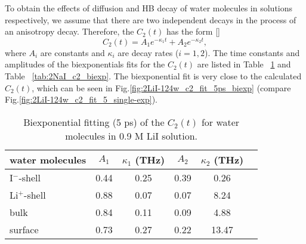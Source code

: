 To obtain the effects of diffusion and HB decay of water molecules
in solutions respectively, we assume that there are two independent 
decays in the process of an anisotropy decay. 
Therefore, the $C_2(t)$ has the form [\cite{TanHS05}]
\begin{equation}
C_2(t)=A_1e^{-\kappa_1 t} +A_2e^{-\kappa_2 t},
\label{eq:tcf3}
\end{equation}
where $A_i$ are constants and $\kappa_i$ are decay rates ($i=1, 2$). 
The time constants and amplitudes of the biexponentials fits for 
the $C_2(t)$ are listed in Table ~\ref{tab:2LiI_c2_biexp} and Table ~\ref{tab:2NaI_c2_biexp}.
The biexponential fit is very close to the calculated $C_2(t)$, which can be seen in Fig.\space\ref{fig:2LiI-124w_c2_fit_5ps_biexp} (compare Fig.\space\ref{fig:2LiI-124w_c2_fit_5_single-exp}).
%
\begin{table}[hbt]
\centering
\caption{\label{tab:2LiI_c2_biexp}%
	Biexponential fitting (5 ps) of the $C_2(t)$ for water molecules in 0.9 M LiI solution.}
\begin{tabular}{lccccc}
water molecules & $A_1$  & $\kappa_1$ (THz) & $A_2$ & $\kappa_2$ (THz) \\
\hline
I$^-$-shell & 0.44 & 0.25 & 0.39 & 0.26\\
Li$^+$-shell & 0.88 & 0.07 & 0.07 & 8.24\\
bulk & 0.84 & 0.11 & 0.09 & 4.88 \\
surface & 0.73 & 0.27 & 0.22 & 13.47 \\
\end{tabular}
\end{table}


